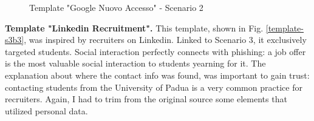 \documentclass[a4paper]{article}
\begin{document}
\bigskip

\begin{figure}[H]
	\centering
	\caption{Template "Google Nuovo Accesso" - Scenario 2}
	\label{template-s2b3}
\end{figure}

\newpage

\noindent
\textbf{Template "Linkedin Recruitment".} This template, shown in Fig. \ref{template-s3b3}, was inspired by recruiters on Linkedin. Linked to Scenario 3, it exclusively targeted students. Social interaction perfectly connects with phishing: a job offer is the most valuable social interaction to students yearning for it. The explanation about where the contact info was found, was important to gain trust: contacting students from the University of Padua is a very common practice for recruiters. Again, I had to trim from the original source some elements that utilized personal data.

\bigskip
\end{document}
